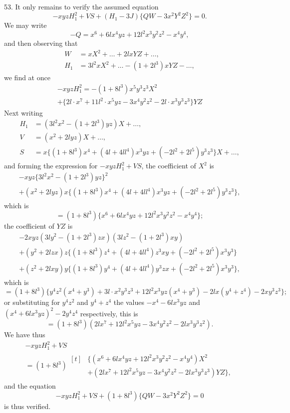 \documentclass[11pt,a4paper]{book}
\begin{document}
53. It only remains to verify the assumed equation
\[
-xyzH_1^2+VS+(H_1-3J)\{QW-3x^2Y^2Z^2\}=0.
\]
We may write
\[
-Q=x^6+6lx^4yz+12l^2x^3y^2z^2-x^4y^4,
\]
and then observing that
\begin{align*}
W &= xX^2+\ldots+2lxYZ+\ldots,\\
H_1 &= 3l^2xX^2+\ldots-(1+2l^3)xYZ-\ldots,
\end{align*}
we find at once
\begin{multline*}
-xyzH_1^2=-(1+8l^3)x^5y^3z^3X^2\\
+\{2l\cdot x^7+11l^2\cdot x^5yz-3x^4y^2z^2-2l\cdot x^3y^3z^3\}YZ
\end{multline*}
Next writing
\begin{align*}
H_1 &= (3l^2x^2-(1+2l^3)yz)X+\ldots,\\
V &= (x^2+2lyz)X+\ldots,\\
S &= x\{(1+8l^3)x^4+(4l+4ll^4)x^3yz+(-2l^2+2l^5)y^3z^3\}X+\ldots,
\end{align*}
and forming the expression for $-xyzH_1^2+VS$, the coefficient of $X^2$ is
\begin{multline*}
-xyz\{3l^2x^2-(1+2l^3)yz\}^2\\
+(x^2+2lyz)x\{(1+8l^3)x^4+(4l+4ll^4)x^3yz+(-2l^2+2l^5)y^3z^3\},
\end{multline*}
which is
\[
=(1+8l^3)\{x^6+6lx^4yz+12l^2x^3y^2z^2-x^4y^4\};
\]
the coefficient of $YZ$ is
\begin{multline*}
-2xyz(3ly^2-(1+2l^3)zx)(3lz^2-(1+2l^3)xy)\\
+(y^2+2lzx)z\{(1+8l^3)z^4+(4l+4ll^4)z^3xy+(-2l^2+2l^5)x^3y^3\}\\
+(z^2+2lxy)y\{(1+8l^3)y^4+(4l+4ll^4)y^3zx+(-2l^2+2l^5)x^3y^3\},
\end{multline*}
which is
\[
=(1+8l^3)\{y^4z^2(x^4+y^3)+3l\cdot x^2y^3z^3+12l^2x^3yz(x^4+y^3)-2lx(y^4+z^4)-2xy^3z^3\};
\]
or substituting for $y^4z^2$ and $y^4+z^4$ the values $-x^4-6lx^3yz$ and $(x^4+6lx^3yz)^2-2y^4z^4$ respectively, this is
\[
=(1+8l^3)(2lx^7+12l^2x^5yz-3x^4y^2z^2-2lx^3y^3z^2).
\]
We have thus
\begin{multline*}
-xyzH_1^2+VS\\
=(1+8l^3)\begin{aligned}[t]
&\{(x^6+6lx^4yz+12l^2x^3y^2z^2-x^4y^4)X^2\\
&+(2lx^7+12l^2x^5yz-3x^4y^2z^2-2lx^3y^3z^3)YZ\},
\end{aligned}
\end{multline*}
and the equation
\[
-xyzH_1^2+VS+(1+8l^3)\{QW-3x^2Y^2Z^2\}=0
\]
is thus verified.
\end{document}

